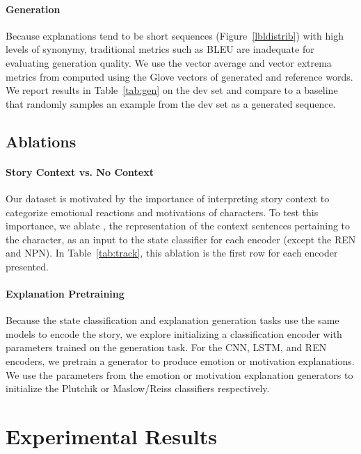 \documentclass[11pt,a4paper]{article}
\begin{document}
\paragraph{Generation} Because explanations tend to be short sequences (Figure~\ref{lbldistrib}) with high levels of synonymy, traditional metrics such as BLEU are inadequate for evaluating generation quality. We use the vector average and vector extrema metrics from \citet{Liu2016HowNT} computed using the Glove vectors of generated and reference words. We report results in Table~\ref{tab:gen} on the dev set and compare to a baseline that randomly samples an example from the dev set as a generated sequence.

\subsection{Ablations}

\paragraph{Story Context vs. No Context} Our dataset is motivated by the importance of interpreting story context to categorize emotional reactions and motivations of characters. To test this importance, we ablate , the representation of the context sentences pertaining to the character, as an input to the state classifier for each encoder (except the REN and NPN). In Table~\ref{tab:track}, this ablation is the first row for each encoder presented.
\vspace{-1mm}
\paragraph{Explanation Pretraining}
Because the state classification and explanation generation tasks use the same models to encode the story, we explore initializing a classification encoder with parameters trained on the generation task. For the CNN, LSTM, and REN encoders, we pretrain a generator to produce emotion or motivation explanations. We use the parameters from the emotion or motivation explanation generators to initialize the Plutchik or Maslow/Reiss classifiers respectively.
 \section{Experimental Results}
\label{sec:experiments}
\end{document}
